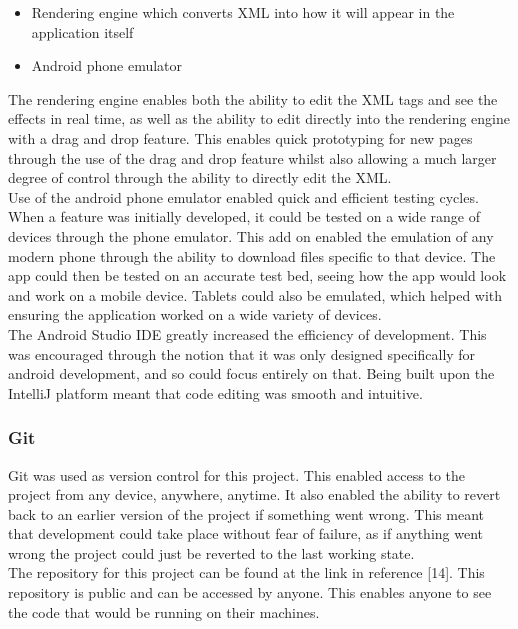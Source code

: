 \documentclass{article}
\begin{document}
\begin{itemize}
	\item Rendering engine which converts XML into how it will appear in the application itself
	\item Android phone emulator
\end{itemize}

The rendering engine enables both the ability to edit the XML tags and see the effects in real time, as well as the ability to edit directly into the rendering engine with a drag and drop feature. This enables quick prototyping for new pages through the use of the drag and drop feature whilst also allowing a much larger degree of control through the ability to directly edit the XML.\\

Use of the android phone emulator enabled quick and efficient testing cycles. When a feature was initially developed, it could be tested on a wide range of devices through the phone emulator. This add on enabled the emulation of any modern phone through the ability to download files specific to that device. The app could then be tested on an accurate test bed, seeing how the app would look and work on a mobile device. Tablets could also be emulated, which helped with ensuring the application worked on a wide variety of devices.\\

The Android Studio IDE greatly increased the efficiency of development. This was encouraged through the notion that it was only designed specifically for android development, and so could focus entirely on that. Being built upon the IntelliJ platform meant that code editing was smooth and intuitive. \\

\subsubsection{Git}

Git was used as version control for this project. This enabled access to the project from any device, anywhere, anytime. It also enabled the ability to revert back to an earlier version of the project if something went wrong. This meant that development could take place without fear of failure, as if anything went wrong the project could just be reverted to the last working state.\\

The repository for this project can be found at the link in reference [14]. This repository is public and can be accessed by anyone. This enables anyone to see the code that would be running on their machines.\\
\end{document}

